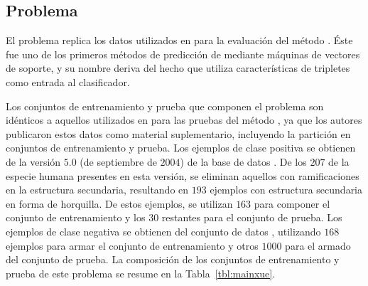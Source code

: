 %
%
\subsection{Problema \tripletsvm}
%
El problema \prob{\tripletsvm} replica los datos utilizados en
\cite{xue} para la evaluación del método \work{\tripletsvm}.
Éste fue uno de los primeros métodos de predicción de 
mediante máquinas de vectores de soporte, y su nombre deriva del hecho
que utiliza características de tripletes como entrada al clasificador.

Los conjuntos de entrenamiento y prueba que componen el problema
\prob{\tripletsvm} son idénticos a aquellos utilizados en \cite{xue}
para las pruebas del método \work{\tripletsvm}, ya que los autores
publicaron estos datos como material suplementario, incluyendo la
partición en conjuntos de entrenamiento y prueba.
Los ejemplos de clase positiva se obtienen de la versión $5$.$0$
(de septiembre de $2004$) de la base de datos \dset\mirbase.
De los $207$  de la especie humana presentes en esta
versión, se eliminan aquellos con ramificaciones en la estructura
secundaria, resultando en $193$ ejemplos con estructura secundaria en
forma de horquilla.
De estos ejemplos, se utilizan $163$ para componer el conjunto de
entrenamiento y los $30$ restantes para el conjunto de prueba.
Los ejemplos de clase negativa se obtienen del conjunto de datos
, utilizando $168$ ejemplos para armar el conjunto de
entrenamiento y otros $1000$ para el armado del conjunto de prueba.
La composición de los conjuntos de entrenamiento y prueba de este
problema se resume en la Tabla~\ref{tbl:mainxue}.
